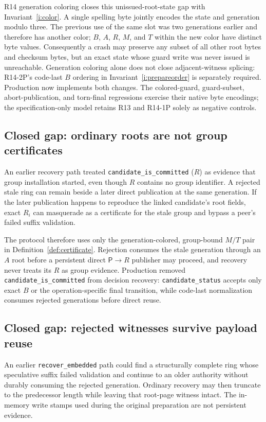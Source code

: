 \documentclass[10pt,twocolumn]{article}
\theoremstyle{remark}
\newcommand{\code}[1]{\texttt{#1}}
\begin{document}
R14 generation coloring closes this unissued-root-state gap with Invariant~\ref{i:color}. A single spelling byte
jointly encodes the state and generation modulo three. The previous use of the same slot was two
generations earlier and therefore has another color; $B$, $A$, $R$, $M$, and $T$ within the new
color have distinct byte values. Consequently a crash may preserve any subset of all other root
bytes and checksum bytes, but an exact state whose guard write was never issued is unreachable.
Generation coloring alone does not close adjacent-witness splicing: R14-2P's code-last $B$ ordering
in Invariant~\ref{i:prepareorder} is separately required. Production now implements both changes.
The colored-guard, guard-subset, abort-publication, and torn-final regressions exercise their native
byte encodings; the specification-only model retains R13 and R14-1P solely as negative controls.

\subsection{Closed gap: ordinary roots are not group certificates}

An earlier recovery path treated \code{candidate\_is\_committed} ($R$) as evidence that group
installation started, even though $R$ contains no group identifier. A rejected stale ring can
remain beside a later direct publication at the same generation. If the later publication happens
to reproduce the linked candidate's root fields, exact $R_i$ can masquerade as a certificate for
the stale group and bypass a peer's failed suffix validation.

The protocol therefore uses only the generation-colored, group-bound $M/T$ pair in
Definition~\ref{def:certificate}. Rejection consumes the stale generation through an $A$ root
before a persistent direct $\mathsf{P}\to R$ publisher may proceed, and recovery never treats
its $R$ as group evidence. Production removed \code{candidate\_is\_committed} from decision
recovery: \code{candidate\_status} accepts only exact $B$ or the operation-specific final
transition, while code-last normalization consumes rejected generations before direct reuse.

\subsection{Closed gap: rejected witnesses survive payload reuse}

An earlier \code{recover\_embedded} path could find a structurally complete ring whose speculative
suffix failed validation and continue to an older authority without durably consuming the rejected
generation.
Ordinary recovery may then truncate to the predecessor length while leaving that root-page witness
intact. The in-memory write stamps used during the original preparation are not persistent evidence.
\end{document}

